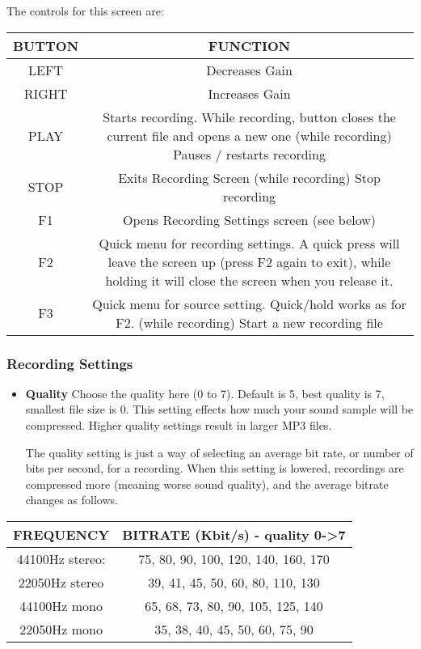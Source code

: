 The controls for this screen are:

\begin{table}[h!]
  \begin{center}
    \begin{tabular}{|c|c|}
      \hline
      BUTTON & FUNCTION \\\hline
      LEFT & Decreases Gain \\\hline
      RIGHT & Increases Gain \\\hline
      PLAY & Starts recording.  While recording, button closes the current file and opens a new one (while recording) Pauses / restarts recording \\\hline
      STOP & Exits Recording Screen (while recording) Stop recording \\\hline
      F1 & Opens Recording Settings screen (see below) \\\hline
      F2 & Quick menu for recording settings. A quick press will leave the screen up (press F2 again to exit), while holding it will close the screen when you release it. \\\hline
      F3 &Quick menu for source setting. Quick/hold works as for F2. (while recording) Start a new recording file \\\hline
    \end{tabular}
  \end{center}
\end{table}

\subsubsection{\label{ref:Recordingsettings}Recording Settings}
\begin{itemize}
\item \textbf{Quality}
Choose the quality here (0 to 7). Default is 5, best quality is 7,
smallest file size is 0.  This setting effects how much your sound
sample will be compressed.  Higher quality settings result in larger
MP3 files.

The quality setting is just a way of selecting an average bit rate, or
number of  bits per second, for a recording.  When  this setting is
lowered, recordings are compressed more (meaning worse sound quality),
and the average bitrate changes as follows.
\end{itemize}

\begin{table}[h!]
  \begin{center}
    \begin{tabular}{|c|c|}
      \hline
      FREQUENCY & BITRATE  (Kbit/s) {}- quality 0{}-{\textgreater}7 \\\hline
      44100Hz stereo: & 75, 80, 90, 100, 120, 140, 160, 170 \\\hline
      22050Hz stereo & 39, 41, 45, 50, 60, 80, 110, 130 \\\hline
      44100Hz mono & 65, 68, 73, 80, 90, 105, 125, 140 \\\hline
      22050Hz mono & 35, 38, 40, 45, 50, 60, 75, 90 \\\hline
    \end{tabular}
  \end{center}
\end{table}

